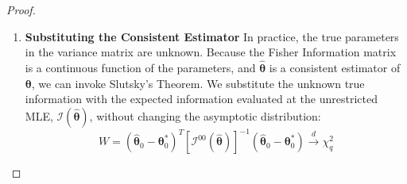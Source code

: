 \documentclass[
  letterpaper,
  DIV=11,
  numbers=noendperiod]{scrreprt}
\renewcommand{\[}{\begin{equation}}
\renewcommand{\]}{\end{equation}}
\theoremstyle{definition}
\theoremstyle{plain}
\theoremstyle{plain}
\theoremstyle{plain}
\theoremstyle{definition}
\theoremstyle{plain}
\theoremstyle{remark}
\begin{document}
\begin{proof}
\begin{enumerate}
  Applying this to our marginal distribution:
  \[(\hat{\boldsymbol{\theta}}_0 - \boldsymbol{\theta}_0^*)^T [\mathcal{I}^{00}(\boldsymbol{\theta}_0^*, \boldsymbol{\theta}_1)]^{-1} (\hat{\boldsymbol{\theta}}_0 - \boldsymbol{\theta}_0^*) \xrightarrow{d} \chi^2_q\]
\item
  \textbf{Substituting the Consistent Estimator} In practice, the true
  parameters in the variance matrix are unknown. Because the Fisher
  Information matrix is a continuous function of the parameters, and
  \(\hat{\boldsymbol{\theta}}\) is a consistent estimator of
  \(\boldsymbol{\theta}\), we can invoke Slutsky's Theorem. We
  substitute the unknown true information with the expected information
  evaluated at the unrestricted MLE,
  \(\mathcal{I}(\hat{\boldsymbol{\theta}})\), without changing the
  asymptotic distribution:
  \[W = (\hat{\boldsymbol{\theta}}_0 - \boldsymbol{\theta}_0^*)^T [\mathcal{I}^{00}(\hat{\boldsymbol{\theta}})]^{-1} (\hat{\boldsymbol{\theta}}_0 - \boldsymbol{\theta}_0^*) \xrightarrow{d} \chi^2_q\]
\end{enumerate}

\end{proof}
\end{document}
